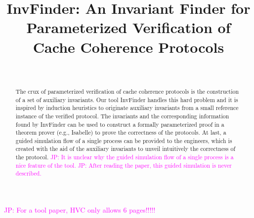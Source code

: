 \documentclass{llncs}
\newcommand\JP[1]{\textcolor{magenta}{JP: #1}}
\begin{document}
\title{ {\sf InvFinder}: An Invariant Finder for Parameterized Verification of Cache Coherence Protocols}
\author{~}
\authorrunning{~}
\institute{~}

\maketitle

\begin{abstract}
The crux of parameterized verification of cache coherence protocols is the construction of a set of auxiliary invariants.
 Our tool  {\sf InvFinder}  handles this hard problem
 and it is inspired by induction heuristics to originate auxiliary invariants from a small reference instance of the verified protocol.
 The invariants and the corresponding information found by {\sf InvFinder}
 can be used to construct a formally parameterized proof in a theorem prover (e.g., Isabelle) to prove
 the correctness of the protocols. At last, a guided simulation flow of a single process can be provided
to the engineers, which is created with the aid of the auxiliary invariants to unveil intuitively the correctness of the protocol.
\JP{It is unclear why the guided simulation flow of a single process is a nice feature of the tool.}
\JP{After reading the paper, this guided simulation is never described.}

\end{abstract}

\JP{For a tool paper, HVC only allows 6 pages!!!!!}

\end{document}
